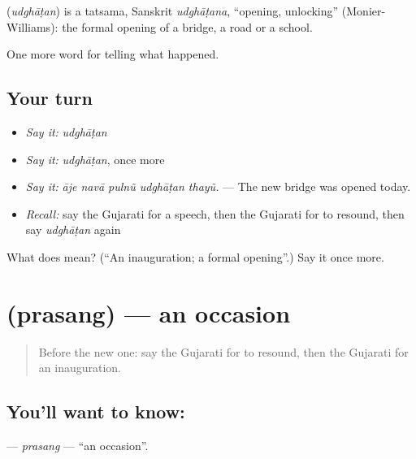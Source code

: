 \begin{cousinweb}
\textbf{} (\emph{udghāṭan}) is a tatsama, Sanskrit \emph{udghāṭana}, \textquotedblleft{}opening, unlocking\textquotedblright{} (Monier-Williams): the formal opening of a bridge, a road or a school.
\end{cousinweb}

\begin{grammarlens}[title={What you've built}]
One more word for telling what happened.
\end{grammarlens}

\subsection*{Your turn}
\begin{itemize}
\raggedright
  \item \emph{Say it:} \emph{udghāṭan}
  \item \emph{Say it:} \emph{udghāṭan}, once more
  \item \emph{Say it:} \emph{āje navā pulnũ udghāṭan thayũ.} — The new bridge was opened today.
  \item \emph{Recall:} say the Gujarati for a speech, then the Gujarati for to resound, then say \emph{udghāṭan} again
\end{itemize}

\begin{tcolorbox}[breakable,colback=teal!4,colframe=teal!35!black,title={Before you move on}]
What does  mean? (\textquotedblleft{}An inauguration; a formal opening\textquotedblright{}.) Say it once more.
\end{tcolorbox}
\section[\texorpdfstring{\gu{પ્રસંગ} (prasang)}{પ્રસંગ (prasang)}]{ (prasang) — an occasion}

\label{lesson:GU-C315-prasang}



\begin{quote}
Before the new one: say the Gujarati for to resound, then the Gujarati for an inauguration.
\end{quote}

\subsection*{You'll want to know: }
\textbf{} — \emph{prasang} — \textquotedblleft{}an occasion\textquotedblright{}.


